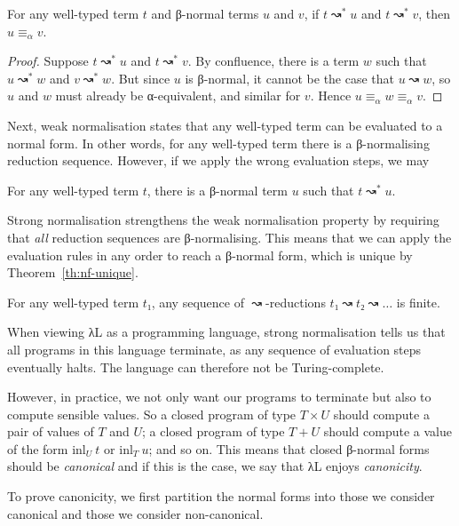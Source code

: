 \documentclass{article}
\theoremstyle{definition}
\newcommand{\inl}{\ensuremath{\mathrm{inl}}}
\begin{document}
\begin{corollary}\label{th:nf-unique}
  For any well-typed term $t$ and β-normal terms $u$ and $v$, if $t ↝^{*} u$ and $t ↝^{*} v$, then $u ≡_{α} v$.
\end{corollary}

\begin{proof}
  Suppose $t ↝^{*} u$ and $t ↝^{*} v$.
  By confluence, there is a term $w$ such that $u ↝^{*} w$ and $v ↝^{*} w$.
  But since $u$ is β-normal, it cannot be the case that $u ↝ w$, so $u$ and $w$ must already be α-equivalent, and similar for $v$.
  Hence $u ≡_{α} w ≡_{α} v$.
\end{proof}

Next, weak normalisation states that any well-typed term can be evaluated to a normal form.
In other words, for any well-typed term there is a β-normalising reduction sequence.
However, if we apply the wrong evaluation steps, we may

\begin{theorem}\label{th:wn}
  For any well-typed term $t$, there is a β-normal term $u$ such that $t ↝^{*} u$.
\end{theorem}

Strong normalisation strengthens the weak normalisation property by requiring that \emph{all} reduction sequences are β-normalising.
This means that we can apply the evaluation rules in any order to reach a β-normal form, which is unique by Theorem~\ref{th:nf-unique}.

\begin{theorem}\label{th:sn}
  For any well-typed term $t₁$, any sequence of $↝$-reductions $t₁ ↝ t₂ ↝ \dots$ is finite.
\end{theorem}

When viewing λL as a programming language, strong normalisation tells us that all programs in this language terminate, as any sequence of evaluation steps eventually halts.
The language can therefore not be Turing-complete.

However, in practice, we not only want our programs to terminate but also to compute sensible values.
So a closed program of type $T × U$ should compute a pair of values of $T$ and $U$; a closed program of type $T + U$ should compute a value of the form $\inl_{U}~t$ or $\inl_{T}~u$; and so on.
This means that closed β-normal forms should be \emph{canonical} and if this is the case, we say that λL enjoys \emph{canonicity}.

To prove canonicity, we first partition the normal forms into those we consider canonical and those we consider non-canonical.
\end{document}
